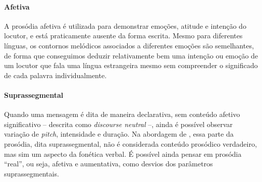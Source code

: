 \paragraph{Afetiva} A prosódia afetiva é utilizada para demonstrar emoções,
atitude e intenção do locutor, e está praticamente ausente da forma escrita.
Mesmo para diferentes línguas, os contornos melódicos associados a diferentes
emoções são semelhantes, de forma que conseguimos deduzir relativamente bem uma
intenção ou emoção de um locutor que fala uma língua estrangeira mesmo sem
compreender o significado de cada palavra individualmente.

\paragraph{Suprassegmental} Quando uma mensagem é dita de maneira declarativa,
sem conteúdo afetivo significativo -- descrita como \emph{discourse neutral} --,
ainda é possível observar variação de \emph{pitch}, intensidade e duração. Na
abordagem de , essa parte da prosódia, dita
suprassegmental, não é considerada conteúdo prosódico verdadeiro, mas sim um
aspecto da fonética verbal. É possível ainda pensar em prosódia ``real'', ou
seja, afetiva e aumentativa, como desvios dos parâmetros suprassegmentais.

